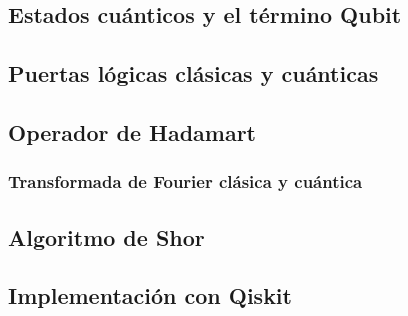 \subsection{Estados cuánticos y el término Qubit}
\subsection{Puertas lógicas clásicas y cuánticas}
\subsection{Operador de Hadamart}
\subsubsection{Transformada de Fourier clásica y cuántica}
\subsection{Algoritmo de Shor}
\subsection{Implementación con Qiskit}